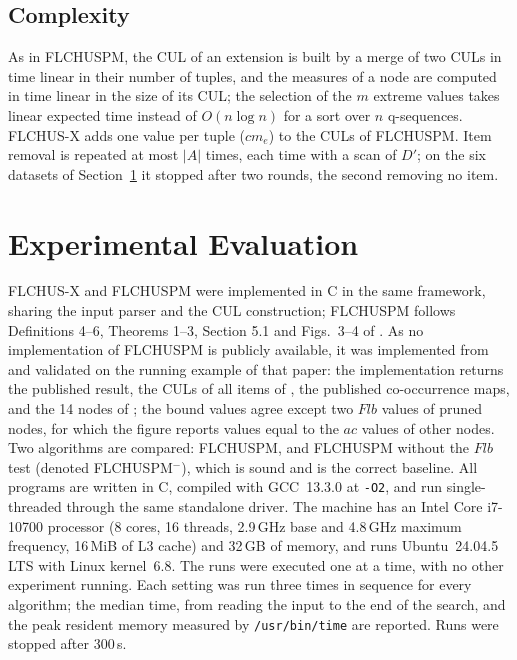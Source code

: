 \documentclass[pdflatex,sn-mathphys,Numbered]{sn-jnl}
\theoremstyle{thmstyleone}
\theoremstyle{thmstyletwo}
\theoremstyle{thmstylethree}
\newcommand{\FL}{\textsc{FLCHUSPM}}
\newcommand{\FX}{\textsc{FLCHUS-X}}
\newcommand{\flb}{\ensuremath{\mathit{Flb}}}
\newcommand{\ac}{\ensuremath{\mathit{ac}}}
\begin{document}
\subsection{Complexity}

As in \FL{}, the CUL of an extension is built by a merge of two CULs in time linear in their
number of tuples, and the measures of a node are computed in time linear in the size of its
CUL; the selection of the $m$ extreme values takes linear expected time instead of
$O(n \log n)$ for a sort over $n$ q-sequences. \FX{} adds one value per tuple
($\mathit{cm}_e$) to the CULs of \FL{}. Item removal is repeated at most $|A|$ times, each time with a scan of
$D'$; on the six datasets of Section~\ref{sec:exp} it stopped after two rounds, the second
removing no item.

\section{Experimental Evaluation}\label{sec:exp}

\FX{} and \FL{} were implemented in C in the same framework, sharing the input parser and the
CUL construction; \FL{} follows Definitions 4--6, Theorems 1--3, Section 5.1 and Figs.~3--4 of
\cite{truong2022}. As no implementation of \FL{} is publicly available, it was implemented from
\cite{truong2022} and validated on the running example of that paper: the implementation returns
the published result, the CULs of all items of \cite[Fig.~1]{truong2022}, the published
co-occurrence maps, and the 14 nodes of \cite[Fig.~5]{truong2022}; the bound values agree
except two \flb{} values of pruned nodes, for which the figure reports values equal to the \ac{}
values of other nodes. Two algorithms are compared: \FL{}, and \FL{} without the \flb{}
test (denoted \FL$^{-}$), which is sound and is the correct baseline. All programs are written in
C, compiled with GCC~13.3.0 at \texttt{-O2}, and run single-threaded through the same standalone
driver. The machine has an Intel Core i7-10700 processor (8 cores, 16 threads, 2.9\,GHz base and
4.8\,GHz maximum frequency, 16\,MiB of L3 cache) and 32\,GB of memory, and runs Ubuntu~24.04.5
LTS with Linux kernel~6.8. The runs were executed one at a time, with no other experiment
running. Each
setting was run three times in sequence for every algorithm; the median time, from reading the
input to the end of the search, and the peak resident memory measured by \texttt{/usr/bin/time}
are reported. Runs were stopped after 300\,s.
\end{document}
